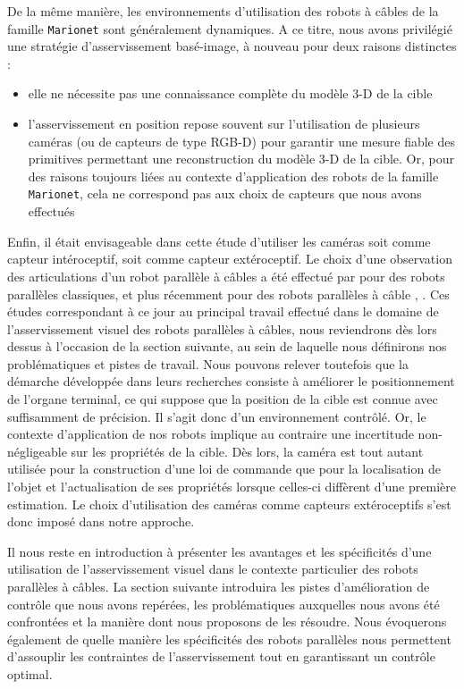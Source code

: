 De la même manière, les environnements d'utilisation des robots à câbles de la 
famille {\tt Marionet} sont généralement dynamiques. A ce titre, nous avons 
privilégié une stratégie d'asservissement basé-image, à nouveau pour deux 
raisons distinctes :
\begin{itemize}
\item elle ne nécessite pas une connaissance complète du modèle 3-D de la cible 
\item l'asservissement en position repose souvent sur l'utilisation de 
plusieurs 
caméras (ou de capteurs de type RGB-D) pour garantir une mesure fiable des 
primitives permettant une reconstruction du modèle 3-D de la cible. Or, pour 
des 
raisons toujours liées au contexte d'application des robots de la famille {\tt 
Marionet}, cela ne correspond pas aux choix de capteurs que nous avons effectués
\end{itemize}

Enfin, il était envisageable dans cette étude d'utiliser les caméras soit comme 
capteur intéroceptif, soit comme capteur extéroceptif. Le choix d'une 
observation des articulations d'un robot parallèle à câbles a été effectué par 
\cite{andreff2007} pour des robots parallèles classiques, et plus récemment 
pour 
des robots parallèles à câble \cite{dallej2011}, \cite{dallej2012}. Ces études 
correspondant à ce jour au principal travail effectué dans le domaine de 
l'asservissement visuel des robots parallèles à câbles, nous reviendrons dès 
lors dessus à l'occasion de la section suivante, au sein de laquelle nous 
définirons nos problématiques et pistes de travail. Nous pouvons relever 
toutefois que la démarche développée dans leurs recherches consiste à améliorer 
le positionnement de l'organe terminal, ce qui suppose que la position de la 
cible est connue avec suffisamment de précision. Il s'agit donc d'un 
environnement contrôlé. Or, le contexte d'application de nos robots implique au 
contraire une incertitude non-négligeable sur les propriétés de la cible. Dès 
lors, la caméra est tout autant utilisée pour la construction d'une loi de 
commande que pour la localisation de l'objet et l'actualisation de ses 
propriétés lorsque celles-ci diffèrent d'une première estimation. Le choix 
d'utilisation des caméras comme capteurs extéroceptifs s'est donc imposé dans 
notre approche.

Il nous reste en introduction à présenter les avantages et les spécificités 
d'une utilisation de l'asservissement visuel dans le contexte particulier des 
robots parallèles à câbles. La section suivante introduira les pistes 
d'amélioration de contrôle que nous avons repérées, les problématiques 
auxquelles nous avons été confrontées et la manière dont nous proposons de les 
résoudre. Nous évoquerons également de quelle manière les spécificités des 
robots parallèles nous permettent d'assouplir les contraintes de 
l'asservissement tout en garantissant un contrôle optimal.

